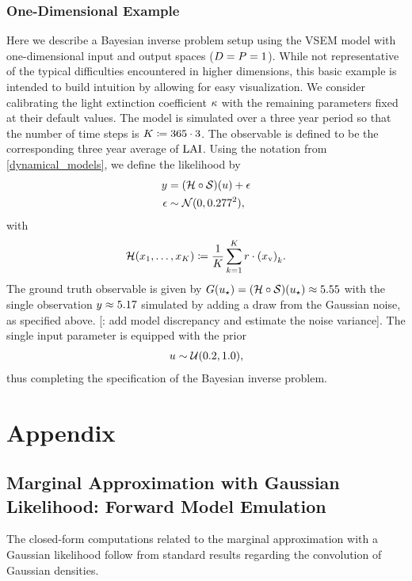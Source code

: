 \documentclass[12pt]{article}
\begin{document}
\subsubsection{One-Dimensional Example} \label{vsem_1d}
Here we describe a Bayesian inverse problem setup using the VSEM model with one-dimensional input and output 
spaces ($\dimPar = \dimObs = 1$). While not representative of the typical difficulties encountered in higher dimensions, 
this basic example is intended to build intuition by allowing for easy visualization. We consider calibrating the light extinction
coefficient $\KEXT$ with the remaining parameters fixed at their default values. The model is simulated over a three year period so 
that the number of time steps is $\NTimeStep \Def 365 \cdot 3$. The observable is defined to be the corresponding three 
year average of $\LAI$. Using the notation from \cref{dynamical_models}, we define the likelihood by 
\begin{align*}
\obs &= (\obsOp \circ \solutionOp)(\Par) + \noise \\
\noise &\sim \Gaussian(0, 0.277^2),
\end{align*}
with
\begin{align*}
\obsOp(\indexTime[1]{\state}, \dots, \indexTime[\NTimeStep]{\state}) 
\Def \frac{1}{\NTimeStep} \sum_{\timeIndex=1}^{\NTimeStep}  \LAR \cdot \indexTime{\left(\stateV\right)}.
\end{align*}
The ground truth observable is given by $\fwd(\ParTrue) = (\obsOp \circ \solutionOp)(\ParTrue) \approx 5.55$ with 
the single observation $\obs \approx 5.17$ simulated by adding a draw from the Gaussian noise, as specified above. 
[\todo: add model discrepancy and estimate the noise variance]. The single input parameter is equipped with the 
prior 
\begin{align*}
\Par \sim \mathcal{U}(0.2, 1.0), 
\end{align*}
thus completing the specification of the Bayesian inverse problem. 


\section{Appendix}

\subsection{Marginal Approximation with Gaussian Likelihood: Forward Model Emulation}
The closed-form computations related to the marginal approximation with a Gaussian 
likelihood follow from standard results regarding the convolution of Gaussian densities.  
\end{document}
